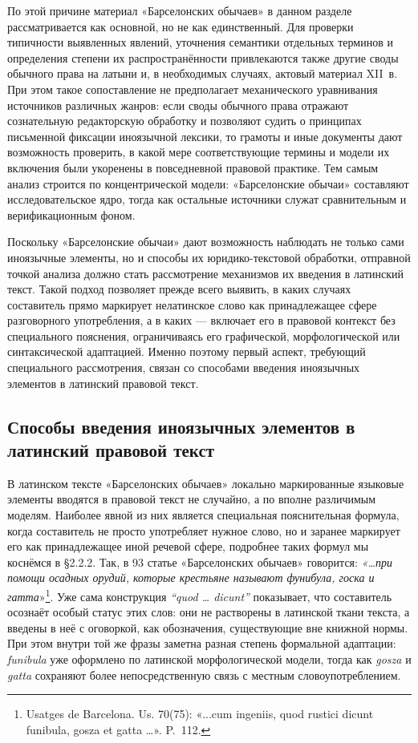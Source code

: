 По этой причине материал «Барселонских обычаев» в данном разделе рассматривается как основной, но не как единственный. Для проверки типичности выявленных явлений, уточнения семантики отдельных терминов и определения степени их распространённости привлекаются также другие своды обычного права на латыни и, в необходимых случаях, актовый материал XII~в. При этом такое сопоставление не предполагает механического уравнивания источников различных жанров: если своды обычного права отражают сознательную редакторскую обработку и позволяют судить о принципах письменной фиксации иноязычной лексики, то грамоты и иные документы дают возможность проверить, в какой мере соответствующие термины и модели их включения были укоренены в повседневной правовой практике. Тем самым анализ строится по концентрической модели: «Барселонские обычаи» составляют исследовательское ядро, тогда как остальные источники служат сравнительным и верификационным фоном.

Поскольку «Барселонские обычаи» дают возможность наблюдать не только сами иноязычные элементы, но и способы их юридико-текстовой обработки, отправной точкой анализа должно стать рассмотрение механизмов их введения в латинский текст. Такой подход позволяет прежде всего выявить, в каких случаях составитель прямо маркирует нелатинское слово как принадлежащее сфере разговорного употребления, а в каких --- включает его в правовой контекст без специального пояснения, ограничиваясь его графической, морфологической или синтаксической адаптацией. Именно поэтому первый аспект, требующий специального рассмотрения, связан со способами введения иноязычных элементов в латинский правовой текст.

\subsection{Способы введения иноязычных элементов в латинский правовой текст}

В латинском тексте «Барселонских обычаев» локально маркированные языковые элементы вводятся в правовой текст не случайно, а по вполне различимым моделям. Наиболее явной из них является специальная пояснительная формула, когда составитель не просто употребляет нужное слово, но и заранее маркирует его как принадлежащее иной речевой сфере, подробнее таких формул мы коснёмся в §2.2.2. Так, в 93 статье «Барселонских обычаев» говорится: \emph{«…при помощи осадных орудий, которые крестьяне называют фунибула, госка и гатта}»\footnote{Usatges de Barcelona. Us. 70(75): «...cum ingeniis, quod rustici dicunt funibula, gosza et gatta …». P.~112.}. Уже сама конструкция \emph{“quod … dicunt”} показывает, что составитель осознаёт особый статус этих слов: они не растворены в латинской ткани текста, а введены в неё с оговоркой, как обозначения, существующие вне книжной нормы. При этом внутри той же фразы заметна разная степень формальной адаптации: \emph{funibula} уже оформлено по латинской морфологической модели, тогда как \emph{gosza} и \emph{gatta} сохраняют более непосредственную связь с местным словоупотреблением.

